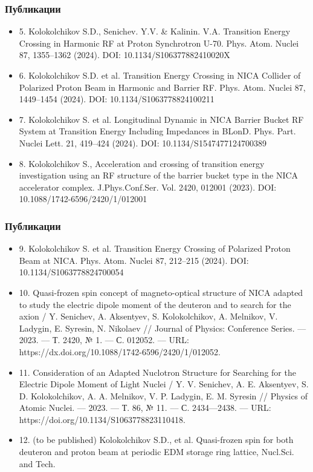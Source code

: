 \begin{frame}
	\frametitle{Публикации}
	\small
	\begin{itemize}
		\item	5. Kolokolchikov S.D., Senichev. Y.V. \& Kalinin. V.A. Transition Energy Crossing in Harmonic RF at Proton Synchrotron U-70. Phys. Atom. Nuclei 87, 1355–1362 (2024). DOI: 10.1134/S106377882410020X
		\item	6. Kolokolchikov S.D. et al. Transition Energy Crossing in NICA Collider of Polarized Proton Beam in Harmonic and Barrier RF. Phys. Atom. Nuclei 87, 1449–1454 (2024). DOI: 10.1134/S1063778824100211
		\item	7. Kolokolchikov S. et al. Longitudinal Dynamic in NICA Barrier Bucket RF System at Transition Energy Including Impedances in BLonD. Phys. Part. Nuclei Lett. 21, 419–424 (2024). DOI: 10.1134/S1547477124700389
		\item	8. Kolokolchikov S., Acceleration and crossing of transition energy investigation using an RF structure of the barrier bucket type in the NICA accelerator complex. J.Phys.Conf.Ser. Vol. 2420, 012001 (2023). DOI: 10.1088/1742-6596/2420/1/012001
	\end{itemize}
\end{frame}
\begin{frame}
	\frametitle{Публикации}
	\small
	\begin{itemize}
		\item	9. Kolokolchikov S. et al. Transition Energy Crossing of Polarized Proton Beam at NICA. Phys. Atom. Nuclei 87, 212–215 (2024). DOI: 10.1134/S1063778824700054
		\item	10. Quasi-frozen spin concept of magneto-optical structure of NICA adapted to
		study the electric dipole moment of the deuteron and to search for the axion / Y. Senichev, A. Aksentyev, S. Kolokolchikov, A. Melnikov, V. Ladygin, E. Syresin, N. Nikolaev // Journal of Physics: Conference Series. –– 2023. –– Т. 2420, № 1. –– С. 012052. –– URL: https://dx.doi.org/10.1088/1742-6596/2420/1/012052.
		\item	11. Consideration of an Adapted Nuclotron Structure for Searching for the Electric Dipole Moment of Light Nuclei / Y. V. Senichev, A. E. Aksentyev, S. D. Kolokolchikov, A. A. Melnikov, V. P. Ladygin, E. M. Syresin // Physics of Atomic Nuclei. –– 2023. –– Т. 86, № 11. –– С. 2434––2438. –– URL: https://doi.org/10.1134/S1063778823110418.
		\item	12. (to be published) Kolokolchikov S.D., et al. Quasi-frozen spin for both deuteron and proton beam at periodic EDM storage ring lattice, Nucl.Sci. and Tech.

	\end{itemize}
\end{frame}

